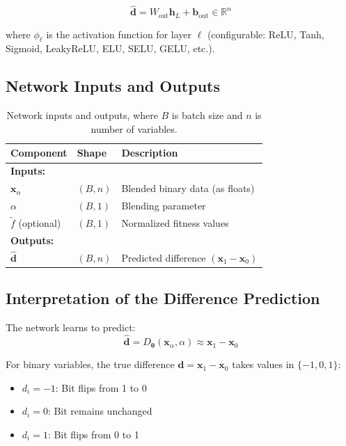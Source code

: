 \documentclass[11pt,a4paper]{article}
\newcommand{\R}{\mathbb{R}}
\newcommand{\vx}{\mathbf{x}}
\newcommand{\vtheta}{\boldsymbol{\theta}}
\begin{document}
\begin{equation}
    \hat{\mathbf{d}} = W_{\text{out}} \mathbf{h}_L + \mathbf{b}_{\text{out}} \in \R^n
\end{equation}

where $\phi_\ell$ is the activation function for layer $\ell$ (configurable: ReLU, Tanh, Sigmoid, LeakyReLU, ELU, SELU, GELU, etc.).

\subsection{Network Inputs and Outputs}

\begin{table}[h]
\centering
\begin{tabular}{@{}lll@{}}
\toprule
\textbf{Component} & \textbf{Shape} & \textbf{Description} \\
\midrule
\textbf{Inputs:} & & \\
$\vx_\alpha$ & $(B, n)$ & Blended binary data (as floats) \\
$\alpha$ & $(B, 1)$ & Blending parameter \\
$\tilde{f}$ (optional) & $(B, 1)$ & Normalized fitness values \\
\midrule
\textbf{Outputs:} & & \\
$\hat{\mathbf{d}}$ & $(B, n)$ & Predicted difference $(\vx_1 - \vx_0)$ \\
\bottomrule
\end{tabular}
\caption{Network inputs and outputs, where $B$ is batch size and $n$ is number of variables.}
\label{tab:io}
\end{table}

\subsection{Interpretation of the Difference Prediction}

The network learns to predict:
\begin{equation}
    \hat{\mathbf{d}} = D_\vtheta(\vx_\alpha, \alpha) \approx \vx_1 - \vx_0
\end{equation}

For binary variables, the true difference $\mathbf{d} = \vx_1 - \vx_0$ takes values in $\{-1, 0, 1\}$:
\begin{itemize}
    \item $d_i = -1$: Bit flips from 1 to 0
    \item $d_i = 0$: Bit remains unchanged
    \item $d_i = 1$: Bit flips from 0 to 1
\end{itemize}
\end{document}
